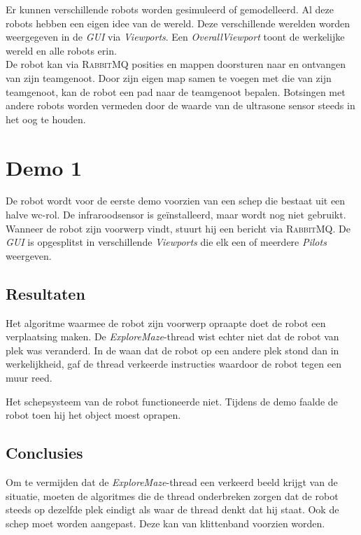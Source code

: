 \documentclass[eind]{penoverslag}
\begin{document}
Er kunnen verschillende robots worden gesimuleerd of gemodelleerd. Al deze robots hebben een eigen idee van de wereld. Deze verschillende werelden worden weergegeven in de \textit{GUI} via \textit{Viewports}. Een \textit{OverallViewport} toont de werkelijke wereld en alle robots erin.\\

De robot kan via \textsc{RabbitMQ} posities en mappen doorsturen naar en ontvangen van zijn teamgenoot. Door zijn eigen map samen te voegen met die van zijn teamgenoot, kan de robot een pad naar de teamgenoot bepalen. Botsingen met andere robots worden vermeden door de waarde van de ultrasone sensor steeds in het oog te houden.


\newpage
\makeappendix

\section{Demo 1}
\label{Asec:demo1}
De robot wordt voor de eerste demo voorzien van een schep die bestaat uit een halve wc-rol. De infraroodsensor is ge\"installeerd, maar wordt nog niet gebruikt. Wanneer de robot zijn voorwerp vindt, stuurt hij een bericht via \textsc{RabbitMQ}. De \textit{GUI} is opgesplitst in verschillende \textit{Viewports} die elk een of meerdere \textit{Pilots} weergeven.

\subsection{Resultaten}
\label{Assec:result1}
Het algoritme waarmee de robot zijn voorwerp opraapte doet de robot een verplaatsing maken. De \textit{ExploreMaze}-thread wist echter niet dat de robot van plek was veranderd. In de waan dat de robot op een andere plek stond dan in werkelijkheid, gaf de thread verkeerde instructies waardoor de robot tegen een muur reed.

Het schepsysteem van de robot functioneerde niet. Tijdens de demo faalde de robot toen hij het object moest oprapen. 

\subsection{Conclusies}
\label{Assec:conc1}
Om te vermijden dat de \textit{ExploreMaze}-thread een verkeerd beeld krijgt van de situatie, moeten de algoritmes die de thread onderbreken zorgen dat de robot steeds op dezelfde plek eindigt als waar de thread denkt dat hij staat.
Ook de schep moet worden aangepast. Deze kan van klittenband voorzien worden.
\end{document}
